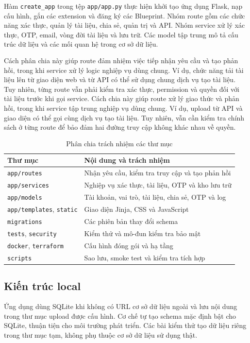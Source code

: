 Hàm \texttt{create\_app} trong tệp \texttt{app/app.py}
thực hiện khởi tạo ứng dụng Flask, nạp cấu hình, gắn các
extension và đăng ký các Blueprint. Nhóm route gồm các
chức năng xác thực, quản lý tài liệu, chia sẻ, quản trị
và API. Nhóm service xử lý xác thực, OTP, email, vòng đời
tài liệu và lưu trữ. Các model tập trung mô tả cấu trúc
dữ liệu và các mối quan hệ trong cơ sở dữ liệu.

Cách phân chia này giúp route đảm nhiệm việc tiếp nhận yêu
cầu và tạo phản hồi, trong khi service xử lý logic nghiệp
vụ dùng chung. Ví dụ, chức năng tải tài liệu lên từ giao
diện web và từ API có thể sử dụng chung dịch vụ tạo tài
liệu. Tuy nhiên, từng route vẫn phải kiểm tra xác thực,
permission và quyền đối với tài liệu trước khi gọi service.
Cách chia này giúp route xử lý giao thức và phản hồi, trong khi service tập trung nghiệp vụ dùng chung. Ví dụ, upload từ API và giao diện có thể gọi cùng dịch vụ tạo tài liệu. Tuy nhiên, vẫn cần kiểm tra chính sách ở từng route để bảo đảm hai đường truy cập không khác nhau về quyền.
\begin{table}[htbp]\centering\small
\caption{Phân chia trách nhiệm các thư mục}
\begin{tabularx}{\textwidth}{P{3.7cm}X}\toprule
\textbf{Thư mục}&\textbf{Nội dung và trách nhiệm}\\\midrule
\texttt{app/routes} & Nhận yêu cầu, kiểm tra truy cập và tạo phản hồi\\
\texttt{app/services} & Nghiệp vụ xác thực, tài liệu, OTP và kho lưu trữ\\
\texttt{app/models} & Tài khoản, vai trò, tài liệu, chia sẻ, OTP và log\\
\texttt{app/templates}, \texttt{static} & Giao diện Jinja, CSS và JavaScript\\
\texttt{migrations} & Các phiên bản thay đổi schema\\
\texttt{tests}, \texttt{security} & Kiểm thử và mô-đun kiểm tra bảo mật\\
\texttt{docker}, \texttt{terraform} & Cấu hình đóng gói và hạ tầng\\
\texttt{scripts} & Sao lưu, smoke test và kiểm tra tích hợp\\\bottomrule
\end{tabularx}\end{table}
\subsection{Kiến trúc local}
Ứng dụng dùng SQLite khi không có URL cơ sở dữ liệu ngoài và lưu nội dung trong thư mục upload được cấu hình. Cơ chế tự tạo schema mặc định bật cho SQLite, thuận tiện cho môi trường phát triển. Các bài kiểm thử tạo dữ liệu riêng trong thư mục tạm, không phụ thuộc cơ sở dữ liệu sử dụng thật.

